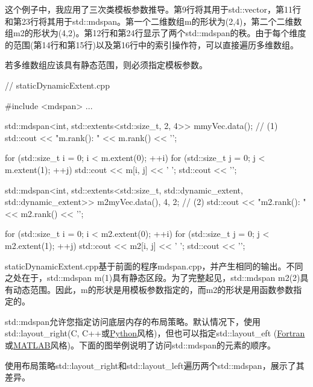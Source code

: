 这个例子中，我应用了三次类模板参数推导。第9行将其用于std::vector，第11行和第23行将其用于std::mdspan。第一个二维数组m的形状为(2,4)，第二个二维数组m2的形状为(4,2)。第12行和第24行显示了两个std::mdspan的秩。由于每个维度的范围(第14行和第15行)以及第16行中的索引操作符，可以直接遍历多维数组。


若多维数组应该具有静态范围，则必须指定模板参数。


\begin{cpp}
// staticDynamicExtent.cpp

#include <mdspan>
...

std::mdspan<int, std::extents<std::size_t, 2, 4>> m{myVec.data()}; // (1)
std::cout << "m.rank(): " << m.rank() << '\n';

for (std::size_t i = 0; i < m.extent(0); ++i) {
	for (std::size_t j = 0; j < m.extent(1); ++j) {
		std::cout << m[i, j] << ' ';
	}
	std::cout << '\n';
}

std::mdspan<int, std::extents<std::size_t, std::dynamic_extent, std::dynamic_extent>>
				m2{myVec.data(), 4, 2}; // (2)
std::cout << "m2.rank(): " << m2.rank() << '\n';

for (std::size_t i = 0; i < m2.extent(0); ++i) {
	for (std::size_t j = 0; j < m2.extent(1); ++j) {
		std::cout << m2[i, j] << ' ';
	}
	std::cout << '\n';
}
\end{cpp}

staticDynamicExtent.cpp基于前面的程序mdspan.cpp，并产生相同的输出。不同之处在于，std::mdspan m(1)具有静态区段。为了完整起见，std::mdspan m2(2)具有动态范围。因此，m的形状是用模板参数指定的，而m2的形状是用函数参数指定的。

std::mdspan允许您指定访问底层内存的布局策略。默认情况下，使用std::layout\_right(C, C++或\href{https://en.wikipedia.org/wiki/Python_(programming_language)}{Python}风格)，但也可以指定std::layout\_eft (\href{https://en.wikipedia.org/wiki/Fortran}{Fortran}或\href{https://en.wikipedia.org/wiki/MATLAB}{MATLAB}风格)。下面的图举例说明了访问std::mdspan的元素的顺序。


使用布局策略std::layout\_right和std::layout\_left遍历两个std::mdspan，展示了其差异。


